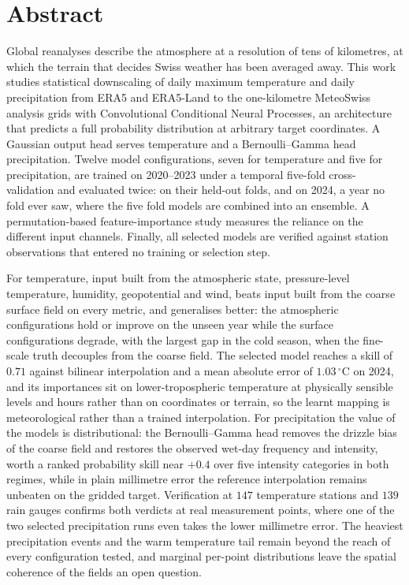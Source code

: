 \chapter*{Abstract}

Global reanalyses describe the atmosphere at a resolution of tens of kilometres, at which the
terrain that decides Swiss weather has been averaged away. This work studies statistical
downscaling of daily maximum temperature and daily precipitation from ERA5 and ERA5-Land to the
one-kilometre MeteoSwiss analysis grids with Convolutional Conditional Neural Processes, an
architecture that predicts a full probability distribution at arbitrary target coordinates. A
Gaussian output head serves temperature and a Bernoulli--Gamma head precipitation. Twelve model
configurations, seven for temperature and five for precipitation, are trained on 2020--2023 under a temporal five-fold cross-validation and
evaluated twice: on their held-out folds, and on 2024, a year no fold ever saw, where the five fold models are combined into an ensemble. A permutation-based
feature-importance study measures the reliance on the different input channels. Finally, all selected
models are verified against station observations that entered no training or selection step.

For temperature, input built from the atmospheric state, pressure-level temperature, humidity,
geopotential and wind, beats input built from the coarse surface field on every metric, and
generalises better: the atmospheric configurations hold or improve on the unseen year while the surface
configurations degrade, with the largest gap in the cold season, when the fine-scale truth
decouples from the coarse field. The selected model reaches a skill of $0.71$ against bilinear
interpolation and a mean absolute error of $1.03\,^{\circ}\mathrm{C}$ on 2024, and its
importances sit on lower-tropospheric temperature at physically sensible levels and hours rather
than on coordinates or terrain, so the learnt mapping is meteorological rather than a trained
interpolation. For precipitation the value of the models is distributional: the Bernoulli--Gamma
head removes the drizzle bias of the coarse field and restores the observed wet-day frequency and
intensity, worth a ranked probability skill near $+0.4$ over five intensity categories in both
regimes, while in plain millimetre error the reference interpolation remains unbeaten on the
gridded target. Verification at $147$ temperature stations and $139$ rain gauges confirms both
verdicts at real measurement points, where one of the two selected precipitation runs even takes the lower
millimetre error. The heaviest precipitation events and the warm temperature tail remain beyond the reach
of every configuration tested, and marginal per-point distributions leave the spatial coherence
of the fields an open question.
